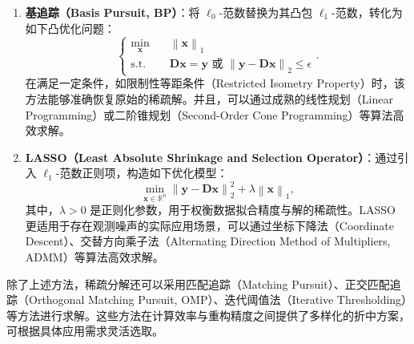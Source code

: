 \begin{enumerate}[label=\arabic*.]
    \item \textbf{基追踪（Basis Pursuit, BP）}：将 \( \ell_0 \)-范数替换为其凸包 \( \ell_1 \)-范数，转化为如下凸优化问题：
          \begin{equation}
              \begin{cases}
                  \min_{\bm{x}} \quad & \left\| \bm{x} \right\|_1                                                                         \\
                  \text{s.t.} \quad   & \mathbf{D} \bm{x} = \bm{y} \text{ 或 } \left\| \bm{y} - \mathbf{D} \bm{x} \right\|_2 \leq \epsilon
              \end{cases}.
              \label{eq:basis-pursuit}
          \end{equation}
          在满足一定条件，如限制性等距条件（Restricted Isometry Property）时，该方法能够准确恢复原始的稀疏解。并且，可以通过成熟的线性规划（Linear Programming）或二阶锥规划（Second-Order Cone Programming）等算法高效求解。

    \item \textbf{LASSO（Least Absolute Shrinkage and Selection Operator）}：通过引入 \( \ell_1 \)-范数正则项，构造如下优化模型：
          \begin{equation}
              \min_{\bm{x} \in \mathbb{R}^n} \left\| \bm{y} - \mathbf{D} \bm{x} \right\|_2^2 + \lambda \left\| \bm{x} \right\|_1,
              \label{eq:lasso}
          \end{equation}
          其中，\( \lambda > 0 \) 是正则化参数，用于权衡数据拟合精度与解的稀疏性。LASSO 更适用于存在观测噪声的实际应用场景，可以通过坐标下降法（Coordinate Descent）、交替方向乘子法（Alternating Direction Method of Multipliers, ADMM）等算法高效求解。
\end{enumerate}

除了上述方法，稀疏分解还可以采用匹配追踪（Matching Pursuit）、正交匹配追踪（Orthogonal Matching Pursuit, OMP）、迭代阈值法（Iterative Thresholding）等方法进行求解。这些方法在计算效率与重构精度之间提供了多样化的折中方案，可根据具体应用需求灵活选取。

